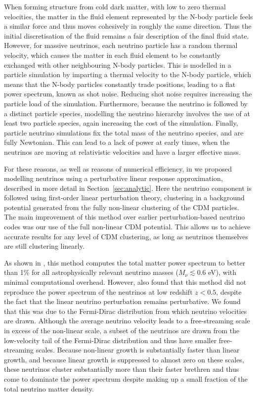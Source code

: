 \documentclass[useAMS, usenatbib]{mnras}
\begin{document}
When forming structure from cold dark matter, with low to zero thermal velocities, the matter in the fluid element represented by the N-body particle feels a similar force and thus moves cohesively in roughly the same direction. Thus
the initial discretisation of the fluid remains a fair description of the final fluid state. However, for massive neutrinos, each neutrino particle has a random thermal velocity, which causes the matter in each fluid element to be constantly exchanged with other neighbouring N-body particles. This is modelled in a particle simulation by imparting a thermal velocity to the N-body particle, which means that the N-body particles constantly trade positions, leading to a flat power spectrum, known as shot noise. Reducing shot noise requires increasing the particle load of the simulation.
Furthermore, because the neutrino is followed by a distinct particle species, modelling the neutrino hierarchy involves the use of at least two particle species, again increasing the cost of the simulation. Finally, particle neutrino simulations fix the total mass of the neutrino species, and are fully Newtonian. This can lead to a lack of power at early times, when the neutrinos are moving at relativistic velocities and have a larger effective mass.

For these reasons, as well as reasons of numerical efficiency, in \cite{AHB} we proposed modelling neutrinos using a perturbative linear response approximation, described in more detail in Section~\ref{sec:analytic}. Here the neutrino component is followed using first-order linear perturbation theory, clustering in a background potential generated from the fully non-linear clustering of the CDM particles. The main improvement of this method over earlier perturbation-based neutrino codes \citep{Brandbyge_2009} was our use of the full non-linear CDM potential. This allows us
to achieve accurate results for any level of CDM clustering, as long as neutrinos themselves are still
clustering linearly.

As shown in \cite{AHB}, this method computes the total matter power spectrum to better
than 1\% for all astrophysically relevant neutrino masses ($M_\nu \lesssim 0.6$ eV), with minimal
computational overhead. However, \citep{AHB} also found that this method did not reproduce the
power spectrum of the neutrinos at low redshift $z < 0.5$, despite the fact that the linear neutrino perturbation remains perturbative. We found that this was due to the Fermi-Dirac distribution from which neutrino velocities are drawn. Although the average neutrino velocity leads to a free-streaming scale in excess of the non-linear scale, a subset of the neutrinos are drawn from the low-velocity tail of the Fermi-Dirac distribution and thus have smaller free-streaming scales. Because non-linear growth is substantially faster than linear growth, and because linear growth is suppressed to almost zero on these scales, these neutrinos cluster substantially more than their faster brethren and thus come to dominate the power spectrum despite making up a small fraction of the total neutrino matter density.
\end{document}
